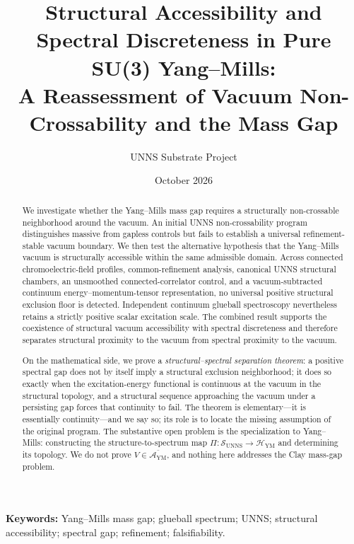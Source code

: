 \documentclass[11pt,a4paper]{article}
\title{\textbf{Structural Accessibility and Spectral Discreteness in Pure SU(3) Yang--Mills:}\\[2pt]
\large A \uns{} Reassessment of Vacuum Non-Crossability and the Mass Gap}
\author{UNNS Substrate Project}
\date{October 2026}
\theoremstyle{definition}
\theoremstyle{remark}
\newcommand{\AYM}{\mathcal{A}_{\mathrm{YM}}}
\newcommand{\SUNNS}{\mathcal{S}_{\mathrm{UNNS}}}
\newcommand{\HYM}{\mathcal{H}_{\mathrm{YM}}}
\newcommand{\uns}{UNNS}
\begin{document}
\maketitle

\begin{abstract}
\noindent We investigate whether the Yang--Mills mass gap requires a structurally non-crossable neighborhood around the vacuum. An initial \uns{} non-crossability program distinguishes massive from gapless controls but fails to establish a universal refinement-stable vacuum boundary. We then test the alternative hypothesis that the Yang--Mills vacuum is structurally accessible within the same admissible domain. Across connected chromoelectric-field profiles, common-refinement analysis, canonical \uns{} structural chambers, an unsmoothed connected-correlator control, and a vacuum-subtracted continuum energy--momentum-tensor representation, no universal positive structural exclusion floor is detected. Independent continuum glueball spectroscopy nevertheless retains a strictly positive scalar excitation scale. The combined result supports the coexistence of structural vacuum accessibility with spectral discreteness and therefore separates structural proximity to the vacuum from spectral proximity to the vacuum.

\smallskip\noindent On the mathematical side, we prove a \emph{structural--spectral separation theorem}: a positive spectral gap does not by itself imply a structural exclusion neighborhood; it does so exactly when the excitation-energy functional is continuous at the vacuum in the structural topology, and a structural sequence approaching the vacuum under a persisting gap forces that continuity to fail. The theorem is elementary---it is essentially continuity---and we say so; its role is to locate the missing assumption of the original program. The substantive open problem is the specialization to Yang--Mills: constructing the structure-to-spectrum map $\Pi:\SUNNS\to\HYM$ and determining its topology. We do not prove $V\in\overline{\AYM}$, and nothing here addresses the Clay mass-gap problem.
\end{abstract}

\vspace{2pt}
\noindent\textbf{Keywords:} Yang--Mills mass gap; glueball spectrum; UNNS; structural accessibility; spectral gap; refinement; falsifiability.

\tableofcontents
\bigskip

\end{document}
